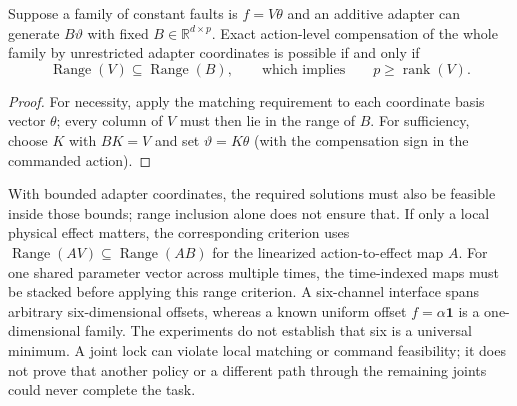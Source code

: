 \begin{proposition}
\label{prop:directions}
Suppose a family of constant faults is $f=V\theta$ and an additive
adapter can generate $B\vartheta$ with fixed $B\in\mathbb R^{d\times p}$. Exact
action-level compensation of the whole family by unrestricted adapter
coordinates is possible if and only if
\begin{equation}
 \operatorname{Range}(V)\subseteq\operatorname{Range}(B),
 \qquad\text{which implies}\qquad
 p\ge\operatorname{rank}(V).
 \label{eq:app-rank}
\end{equation}
\end{proposition}
\begin{proof}
For necessity, apply the matching requirement to each coordinate basis vector
$\theta$; every column of $V$ must then lie in the range of $B$.
For sufficiency, choose $K$ with $BK=V$ and set $\vartheta=K\theta$
(with the compensation sign in the commanded action).
\end{proof}
With bounded adapter coordinates, the required solutions must also be feasible
inside those bounds; range inclusion alone does not ensure that. If only a local
physical effect matters, the corresponding criterion uses
$\operatorname{Range}(A V)\subseteq\operatorname{Range}(A B)$ for the
linearized action-to-effect map $A$. For one shared parameter vector across
multiple times, the time-indexed maps must be stacked before applying this
range criterion. A six-channel interface spans arbitrary six-dimensional
offsets, whereas a known uniform offset $f=\alpha\mathbf 1$ is a one-dimensional
family. The experiments do not establish that six is a universal minimum.
A joint lock can violate local matching or command feasibility; it does not
prove that another policy or a different path through the remaining joints
could never complete the task.

